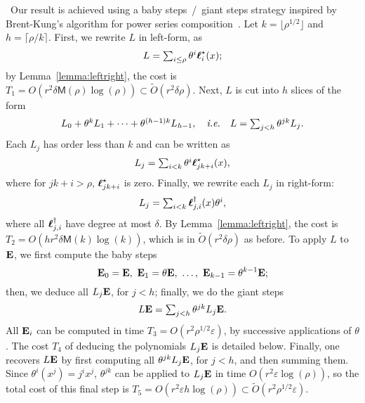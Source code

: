 \documentclass{sig-alternate}
\def\bell{\mbox{\boldmath$\ell$}}
\newcommand{\bigOsoft}{\tilde{O}}
\def\M{\ensuremath{\mathsf{M}}}
\def\mE {\ensuremath{{\bf E}}}
\def\myproof{\noindent{\sc Proof.}~}
\begin{document}
\smallskip\noindent\myproof Our result is achieved using a baby
steps~/~giant steps strategy inspired by Brent-Kung's algorithm for
power series composition~\cite{BrKu78}. Let $k=\lfloor
\rho^{1/2}\rfloor$ and $h=\lceil \rho/k\rceil$. First, we rewrite $L$
in left-form, as
$$\begin{array}{c}L=\sum_{i \le \rho} \theta^i\bell^\star_i(x);\end{array}$$ 
by Lemma~\ref{lemma:leftright}, the cost is $T_1\!=\!O(r^2 \delta
\M(\rho)\log(\rho))\subset \bigOsoft(r^2 \delta \rho)$.
Next, $L$ is cut into $h$ slices of the form
$$
\begin{array}{c}
L_0 + \theta^k L_1 +  \cdots + \theta^{(h-1)k} L_{h-1},
\quad\text{\it i.e.}\quad
L=\sum_{j < h} \theta^{jk}L_j.
\end{array}
$$
Each $L_j$ has order less than $k$ and can be written as
$$\begin{array}{c}L_j = \sum_{i < k} \theta^i \bell^\star_{jk+i}(x),\end{array}$$ 
where for $jk+i > \rho$,  $\bell^\star_{jk+i}$ is
zero. Finally, we rewrite each $L_j$ in right-form:
\begin{equation}\label{eq:L''}
\begin{array}{c}
L_j = \sum_{i < k}  \bell^\dagger_{j,i}(x) \theta^i,  
\end{array}
\end{equation}
where all $\bell^\dagger_{j,i}$ have degree at most $\delta$. By
Lemma~\ref{lemma:leftright}, the cost is $T_2=O(hr^2\delta
\M(k)\log(k))$, which is in $\bigOsoft(r^2\delta \rho)$ as before.  
To apply
$L$ to $\mE$, we first compute the baby steps
$$\mE_0=\mE,\ \mE_1=\theta \mE,\ \dots,\ \mE_{k-1}=\theta^{k-1} \mE;$$
then, we deduce all $L_j \mE$, for $j<h$; finally, we do the giant
steps
$$\begin{array}{c}L \mE=\sum_{j<h} \theta^{jk} L_j \mE.\end{array}$$
All $\mE_i$ can be computed in time $T_3=O(r^2 \rho^{1/2}\varepsilon
)$, by successive applications of $\theta$. The cost $T_4$ of deducing
the polynomials $L_j \mE$ is detailed below. Finally, one recovers $L
\mE$ by first computing all $\theta^{jk} L_j \mE$, for $j<h$, and then
summing them. Since $\theta^i(x^j) = j^i x^j$, $\theta^{jk}$ can be
applied to $L_j \mE$ in time $O(r^2\varepsilon\log(\rho))$, so the
total cost of this final step is $T_5=O(r^2 \varepsilon h
\log(\rho))\subset \bigOsoft(r^2 \rho^{1/2} \varepsilon)$.
\end{document}
